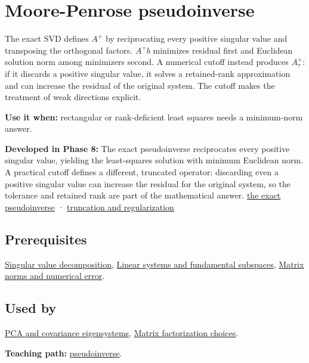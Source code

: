 \hypertarget{appendix-541306fdbc1b}{}
\section{Moore-Penrose pseudoinverse}\label{appendix-541306fdbc1b-moore-penrose-pseudoinverse}

The exact SVD defines \(A^+\) by reciprocating every positive singular value and transposing the orthogonal factors. \(A^+b\) minimizes residual first and Euclidean solution norm among minimizers second. A numerical cutoff instead produces \(A_\tau^+\): if it discards a positive singular value, it solves a retained-rank approximation and can increase the residual of the original system. The cutoff makes the treatment of weak directions explicit.

\textbf{Use it when:} rectangular or rank-deficient least squares needs a minimum-norm answer.

\textbf{Developed in Phase 8:} The exact pseudoinverse reciprocates every positive singular value, yielding the least-squares solution with minimum Euclidean norm. A practical cutoff defines a different, truncated operator: discarding even a positive singular value can increase the residual for the original system, so the tolerance and retained rank are part of the mathematical answer. \hyperref[02-foundations-ii-ch024-the-moorepenrose-inverse-and-its-four-identities]{the exact pseudoinverse} · \hyperref[02-foundations-ii-ch024-thresholding-and-regularization-are-different-choices]{truncation and regularization}

\subsection{Prerequisites}\label{appendix-541306fdbc1b-prerequisites}

\hyperref[appendix-1fad5e7f36fa]{Singular value decomposition}, \hyperref[appendix-8572a4a060c1]{Linear systems and fundamental subspaces}, \hyperref[appendix-f8657bac66e5]{Matrix norms and numerical error}.

\subsection{Used by}\label{appendix-541306fdbc1b-used-by}

\hyperref[appendix-ad175ef3c5bf]{PCA and covariance eigensystems}, \hyperref[appendix-221a483bec2d]{Matrix factorization choices}.

\textbf{Teaching path:} \hyperref[02-foundations-ii-ch024-pseudoinverse-makes-least-squares-and-minimum-norm-one-operation]{pseudoinverse}.
